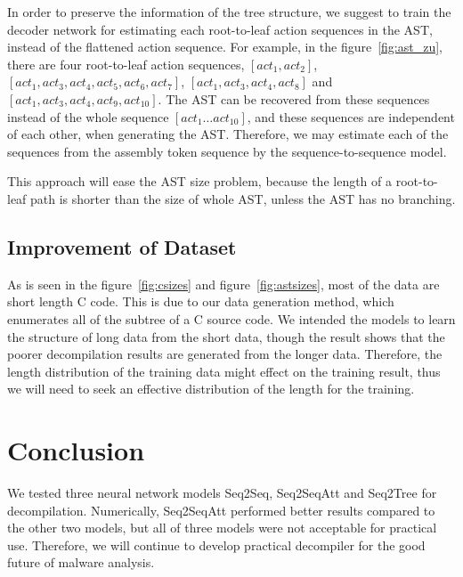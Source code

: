 \documentclass[senior,final,11pt]{iscs-thesis}
\begin{document}
In order to preserve the information of the tree structure, we suggest to train the decoder network for estimating each root-to-leaf action sequences in the AST,
instead of the flattened action sequence. 
For example, in the figure~\ref{fig:ast_zu}, there are four root-to-leaf action sequences, 
$ [act_1, act_2] $, $ [act_1, act_3,act_4,act_5,act_6,act_7] $, $ [act_1, act_3,act_4,act_8] $ and $ [act_1, act_3,act_4,act_9,act_{10}] $.
The AST can be recovered from these sequences instead of the whole sequence $ [act_1 \dots act_{10}] $, 
and these sequences are independent of each other, when generating the AST.
Therefore, we may estimate each of the sequences from the assembly token sequence by the sequence-to-sequence model.

This approach will ease the AST size problem, because the length of a root-to-leaf path is shorter than the size of whole AST, unless the AST has no branching.







\section{Improvement of Dataset}
As is seen in the figure~\ref{fig:csizes} and figure~\ref{fig:astsizes}, most of the data are short length C code.
This is due to our data generation method, which enumerates all of the subtree of a C source code.
We intended the models to learn the structure of long data from the short data, though the result shows that 
the poorer decompilation results are generated from the longer data.
Therefore, the length distribution of the training data might effect on the training result, 
thus we will need to seek an effective distribution of the length for the training.





\chapter{Conclusion}
We tested three neural network models Seq2Seq, Seq2SeqAtt and Seq2Tree for decompilation.
Numerically, Seq2SeqAtt performed better results compared to the other two models,
but all of three models were not acceptable for practical use.
Therefore, we will continue to develop practical decompiler for the good future of malware analysis.
\end{document}
